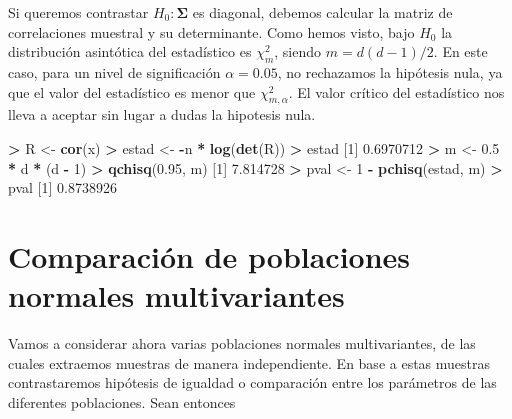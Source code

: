 \documentclass[
  a4paper,
  oneside]{scrbook}
\newenvironment{Shaded}{\begin{snugshade}}{\end{snugshade}}
\newcommand{\DecValTok}[1]{\textcolor[rgb]{0.00,0.00,0.81}{#1}}
\newcommand{\FloatTok}[1]{\textcolor[rgb]{0.00,0.00,0.81}{#1}}
\newcommand{\FunctionTok}[1]{\textcolor[rgb]{0.13,0.29,0.53}{\textbf{#1}}}
\newcommand{\NormalTok}[1]{#1}
\newcommand{\OtherTok}[1]{\textcolor[rgb]{0.56,0.35,0.01}{#1}}
\newcommand{\SpecialCharTok}[1]{\textcolor[rgb]{0.81,0.36,0.00}{\textbf{#1}}}
\theoremstyle{definition}
\theoremstyle{definition}
\theoremstyle{definition}
\theoremstyle{definition}
\theoremstyle{remark}
\begin{document}
\normalsize

Si queremos contrastar \(H_0:\bm\Sigma\) es diagonal, debemos calcular la
matriz de correlaciones muestral y su determinante. Como hemos visto,
bajo \(H_0\) la distribución asintótica del estadístico es \(\chi_m^2\),
siendo \(m=d(d-1)/2\). En este caso, para un nivel de significación
\(\alpha=0.05\), no rechazamos la hipótesis nula, ya que el valor del
estadístico es menor que \(\chi_{m,\alpha}^2\). El valor crítico del
estadístico nos lleva a aceptar sin lugar a dudas la hipotesis nula.

\footnotesize

\begin{Shaded}
\begin{Highlighting}[]
\SpecialCharTok{\textgreater{}}\NormalTok{ R }\OtherTok{\textless{}{-}} \FunctionTok{cor}\NormalTok{(x)}
\SpecialCharTok{\textgreater{}}\NormalTok{ estad }\OtherTok{\textless{}{-}} \SpecialCharTok{{-}}\NormalTok{n }\SpecialCharTok{*} \FunctionTok{log}\NormalTok{(}\FunctionTok{det}\NormalTok{(R))}
\SpecialCharTok{\textgreater{}}\NormalTok{ estad}
\NormalTok{[}\DecValTok{1}\NormalTok{] }\FloatTok{0.6970712}
\SpecialCharTok{\textgreater{}}\NormalTok{ m }\OtherTok{\textless{}{-}} \FloatTok{0.5} \SpecialCharTok{*}\NormalTok{ d }\SpecialCharTok{*}\NormalTok{ (d }\SpecialCharTok{{-}} \DecValTok{1}\NormalTok{)}
\SpecialCharTok{\textgreater{}} \FunctionTok{qchisq}\NormalTok{(}\FloatTok{0.95}\NormalTok{, m)}
\NormalTok{[}\DecValTok{1}\NormalTok{] }\FloatTok{7.814728}
\SpecialCharTok{\textgreater{}}\NormalTok{ pval }\OtherTok{\textless{}{-}} \DecValTok{1} \SpecialCharTok{{-}} \FunctionTok{pchisq}\NormalTok{(estad, m)}
\SpecialCharTok{\textgreater{}}\NormalTok{ pval}
\NormalTok{[}\DecValTok{1}\NormalTok{] }\FloatTok{0.8738926}
\end{Highlighting}
\end{Shaded}

\normalsize

\section{Comparación de poblaciones normales multivariantes}\label{comparacion-de-poblaciones-normales-multivariantes}

Vamos a considerar ahora varias poblaciones normales multivariantes, de
las cuales extraemos muestras de manera independiente. En base a estas
muestras contrastaremos hipótesis de igualdad o comparación entre los
parámetros de las diferentes poblaciones. Sean entonces
\end{document}
